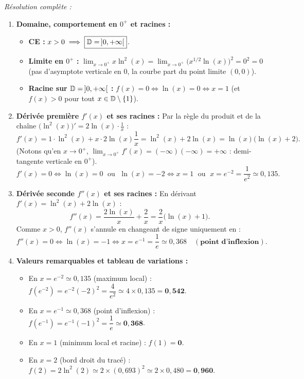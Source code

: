 \begin{exemple}
\emph{Résolution complète :}
\begin{enumerate}[label=\alph*)]
    \item \textbf{Domaine, comportement en $0^+$ et racines :}
    \begin{itemize}
        \item \textbf{CE :} $x > 0 \implies \boxed{\mathbb{D} = \,]0, +\infty[}$.
        \item \textbf{Limite en $0^+$ :} $\lim_{x \to 0^+} x\ln^2(x) = \lim_{x \to 0^+} \bigl(x^{1/2}\ln(x)\bigr)^2 = 0^2 = 0$ (pas d'asymptote verticale en $0$, la courbe part du point limite $(0, 0)$).
        \item \textbf{Racine sur $\mathbb{D} = \,]0, +\infty[$ :} $f(x) = 0 \iff \ln(x) = 0 \iff \boxed{x = 1}$ (et $f(x) > 0$ pour tout $x \in \mathbb{D} \setminus \{1\}$).
    \end{itemize}
    \item \textbf{Dérivée première $f'(x)$ et ses racines :} Par la règle du produit et de la chaîne $\bigl(\ln^2(x)\bigr)' = 2\ln(x)\cdot\frac{1}{x}$ :
    \[
        f'(x) = 1\cdot\ln^2(x) + x \cdot 2\ln(x)\frac{1}{x} = \ln^2(x) + 2\ln(x) = \boxed{\ln(x)\bigl(\ln(x) + 2\bigr)}.
    \]
    (Notons qu'en $x \to 0^+$, $\lim_{x \to 0^+} f'(x) = (-\infty)(-\infty) = +\infty$ : demi-tangente verticale en $0^+$).
    \[
        f'(x) = 0 \iff \ln(x) = 0 \;\text{ ou }\; \ln(x) = -2 \iff \boxed{x = 1 \;\text{ ou }\; x = e^{-2} = \frac{1}{e^2} \simeq 0,135}.
    \]
    \item \textbf{Dérivée seconde $f''(x)$ et ses racines :} En dérivant $f'(x) = \ln^2(x) + 2\ln(x)$ :
    \[
        f''(x) = \frac{2\ln(x)}{x} + \frac{2}{x} = \boxed{\frac{2}{x}\bigl(\ln(x) + 1\bigr)}.
    \]
    Comme $x > 0$, $f''(x)$ s'annule en changeant de signe uniquement en :
    \[
        f''(x) = 0 \iff \ln(x) = -1 \iff \boxed{x = e^{-1} = \frac{1}{e} \simeq 0,368} \quad (\textbf{point d'inflexion}).
    \]
    \item \textbf{Valeurs remarquables et tableau de variations :}
    \begin{itemize}
        \item En $x = e^{-2} \simeq 0,135$ (maximum local) : $f(e^{-2}) = e^{-2}(-2)^2 = \dfrac{4}{e^2} \simeq 4 \times 0,135 = \mathbf{0,542}$.
        \item En $x = e^{-1} \simeq 0,368$ (point d'inflexion) : $f(e^{-1}) = e^{-1}(-1)^2 = \dfrac{1}{e} \simeq \mathbf{0,368}$.
        \item En $x = 1$ (minimum local et racine) : $f(1) = \mathbf{0}$.
        \item En $x = 2$ (bord droit du tracé) : $f(2) = 2\ln^2(2) \simeq 2 \times (0,693)^2 \simeq 2 \times 0,480 = \mathbf{0,960}$.

\end{itemize}
\end{enumerate}
\end{exemple}
